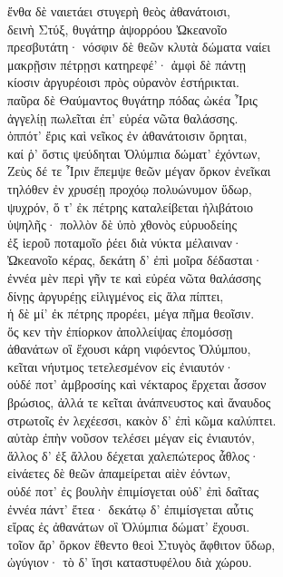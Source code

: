 \begin{pages}
\begin{Leftside}
\quad{}ἔνθα δὲ ναιετάει στυγερὴ θεὸς ἀθανάτοισι, \\
δεινὴ Στύξ, θυγάτηρ ἀψορρόου Ὠκεανοῖο\\
πρεσβυτάτη· νόσφιν δὲ θεῶν κλυτὰ δώματα ναίει \\
μακρῇσιν πέτρῃσι κατηρεφέ'· ἀμφὶ δὲ πάντῃ \\
κίοσιν ἀργυρέοισι πρὸς οὐρανὸν ἐστήρικται.\\
παῦρα δὲ Θαύμαντος θυγάτηρ πόδας ὠκέα Ἶρις \\
ἀγγελίῃ πωλεῖται ἐπ' εὐρέα νῶτα θαλάσσης. \\
ὁππότ' ἔρις καὶ νεῖκος ἐν ἀθανάτοισιν ὄρηται, \\
καί ῥ' ὅστις ψεύδηται Ὀλύμπια δώματ' ἐχόντων,\\
Ζεὺς δέ τε Ἶριν ἔπεμψε θεῶν μέγαν ὅρκον ἐνεῖκαι\\
τηλόθεν ἐν χρυσέῃ προχόῳ πολυώνυμον ὕδωρ,  \\
ψυχρόν, ὅ τ' ἐκ πέτρης καταλείβεται ἠλιβάτοιο \\
ὑψηλῆς· πολλὸν δὲ ὑπὸ χθονὸς εὐρυοδείης \\
ἐξ ἱεροῦ ποταμοῖο ῥέει διὰ νύκτα μέλαιναν· \\
Ὠκεανοῖο κέρας, δεκάτη δ' ἐπὶ μοῖρα δέδασται· \\
ἐννέα μὲν περὶ γῆν τε καὶ εὐρέα νῶτα θαλάσσης \\
δίνῃς ἀργυρέῃς εἱλιγμένος εἰς ἅλα πίπτει,\\
ἡ δὲ μί' ἐκ πέτρης προρέει, μέγα πῆμα θεοῖσιν. \\
ὅς κεν τὴν ἐπίορκον ἀπολλείψας ἐπομόσσῃ\\
ἀθανάτων οἳ ἔχουσι κάρη νιφόεντος Ὀλύμπου,\\
κεῖται νήυτμος τετελεσμένον εἰς ἐνιαυτόν·  \\
οὐδέ ποτ' ἀμβροσίης καὶ νέκταρος ἔρχεται ἆσσον\\
βρώσιος, ἀλλά τε κεῖται ἀνάπνευστος καὶ ἄναυδος\\
στρωτοῖς ἐν λεχέεσσι, κακὸν δ' ἐπὶ κῶμα καλύπτει.\\
αὐτὰρ ἐπὴν νοῦσον τελέσει μέγαν εἰς ἐνιαυτόν,\\
ἄλλος δ' ἐξ ἄλλου δέχεται χαλεπώτερος ἆθλος·  \\
εἰνάετες δὲ θεῶν ἀπαμείρεται αἰὲν ἐόντων,\\
οὐδέ ποτ' ἐς βουλὴν ἐπιμίσγεται οὐδ' ἐπὶ δαῖτας\\
ἐννέα πάντ' ἔτεα· δεκάτῳ δ' ἐπιμίσγεται αὖτις \\
εἴρας ἐς ἀθανάτων οἳ Ὀλύμπια δώματ' ἔχουσι. \\
τοῖον ἄρ' ὅρκον ἔθεντο θεοὶ Στυγὸς ἄφθιτον ὕδωρ,  \\
ὠγύγιον· τὸ δ' ἵησι καταστυφέλου διὰ χώρου. \\


\end{Leftside}
\end{pages}
